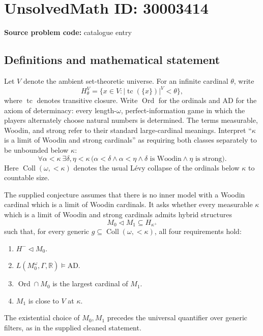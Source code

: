 \documentclass[11pt]{article}
\begin{document}
\section*{UnsolvedMath ID: 30003414}
\textbf{Source problem code:} catalogue entry
\subsection{Definitions and mathematical statement}
Let \(V\) denote the ambient set-theoretic universe. For an infinite cardinal \(\theta\), write
\[
H_\theta^V=\{x\in V:|\operatorname{tc}(\{x\})|^V<\theta\},
\]
where \(\operatorname{tc}\) denotes transitive closure. Write \(\operatorname{Ord}\) for the ordinals and \(\mathrm{AD}\) for the axiom of determinacy: every length-\(\omega\), perfect-information game in which the players alternately choose natural numbers is determined. The terms measurable, Woodin, and strong refer to their standard large-cardinal meanings. Interpret ``\(\kappa\) is a limit of Woodin and strong cardinals'' as requiring both classes separately to be unbounded below \(\kappa\):
\[
\forall\alpha<\kappa\ \exists\delta,\eta<\kappa\,
\bigl(\alpha<\delta\land\alpha<\eta\land
\delta\text{ is Woodin}\land\eta\text{ is strong}\bigr).
\]
Here \(\operatorname{Coll}(\omega,{<}\kappa)\) denotes the usual L\'evy collapse of the ordinals below \(\kappa\) to countable size.

The supplied conjecture assumes that there is no inner model with a Woodin cardinal which is a limit of Woodin cardinals. It asks whether every measurable \(\kappa\) which is a limit of Woodin and strong cardinals admits hybrid structures
\[
M_0\mathrel{\triangleleft}M_1\subseteq H_{\kappa^+}
\]
such that, for every generic \(g\subseteq\operatorname{Coll}(\omega,{<}\kappa)\), all four requirements hold:
\begin{enumerate}
\item \(H^-\mathrel{\triangleleft}M_0\).
\item \(L(M_0^\omega,\Gamma,\mathbb R)\models\mathrm{AD}\).
\item \(\operatorname{Ord}\cap M_0\) is the largest cardinal of \(M_1\).
\item \(M_1\) is close to \(V\) at \(\kappa\).
\end{enumerate}
The existential choice of \(M_0,M_1\) precedes the universal quantifier over generic filters, as in the supplied cleaned statement.
\end{document}
